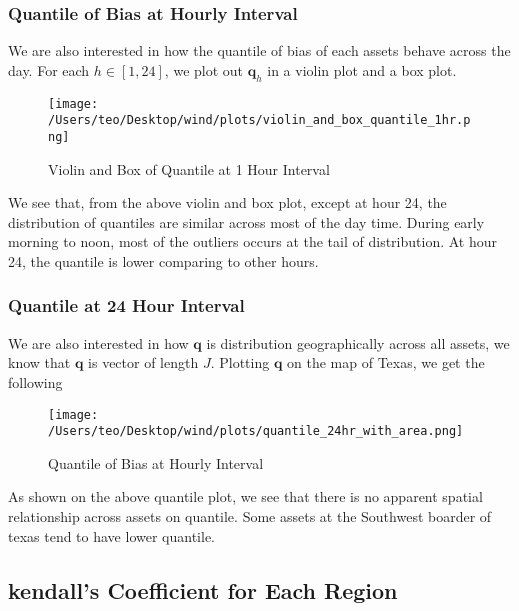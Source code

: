 \documentclass[
]{article}
\begin{document}
\hypertarget{quantile-of-bias-at-hourly-interval}{%
\subsubsection{Quantile of Bias at Hourly
Interval}\label{quantile-of-bias-at-hourly-interval}}

We are also interested in how the quantile of bias of each assets behave
across the day. For each \(h \in [1,24]\), we plot out \(\mathbf{q}_h\)
in a violin plot and a box plot.

\begin{figure}
\centering
\texttt{[image: /Users/teo/Desktop/wind/plots/violin\_and\_box\_quantile\_1hr.png]}
\caption{Violin and Box of Quantile at 1 Hour Interval}
\end{figure}

We see that, from the above violin and box plot, except at hour 24, the
distribution of quantiles are similar across most of the day time.
During early morning to noon, most of the outliers occurs at the tail of
distribution. At hour 24, the quantile is lower comparing to other
hours.

\hypertarget{quantile-at-24-hour-interval}{%
\subsubsection{Quantile at 24 Hour
Interval}\label{quantile-at-24-hour-interval}}

We are also interested in how \(\mathbf{q}\) is distribution
geographically across all assets, we know that \(\mathbf{q}\) is vector
of length \(J\). Plotting \(\mathbf{q}\) on the map of Texas, we get the
following

\begin{figure}
\centering
\texttt{[image: /Users/teo/Desktop/wind/plots/quantile\_24hr\_with\_area.png]}
\caption{Quantile of Bias at Hourly
Interval}
\end{figure}

As shown on the above quantile plot, we see that there is no apparent
spatial relationship across assets on quantile. Some assets at the
Southwest boarder of texas tend to have lower quantile.

\hypertarget{kendalls-coefficient-for-each-region}{%
\subsection{kendall's Coefficient for Each
Region}\label{kendalls-coefficient-for-each-region}}
\end{document}
